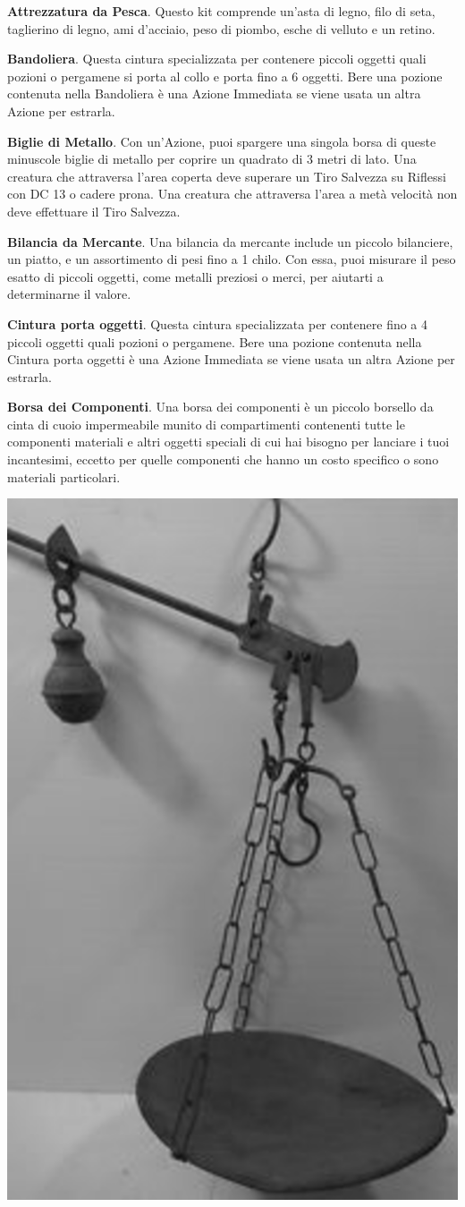 \begin{multicols}{2}
\textbf{Attrezzatura da Pesca}. Questo kit comprende un'asta di legno, filo di seta, taglierino di legno, ami d'acciaio, peso di piombo, esche di velluto e un retino.

\textbf{Bandoliera}\label{Bandoliera}\hypertarget{Bandoliera}{}. Questa cintura specializzata per contenere piccoli oggetti quali pozioni o pergamene si porta al collo e porta fino a 6 oggetti. Bere una pozione contenuta nella Bandoliera è una Azione Immediata se viene usata un altra Azione per estrarla.

\textbf{Biglie di Metallo}. Con un'Azione, puoi spargere una singola borsa di queste minuscole biglie di metallo per coprire un quadrato di 3 metri di lato. Una creatura che attraversa l'area coperta deve superare un Tiro Salvezza su Riflessi con DC 13 o cadere prona. Una creatura che attraversa l'area a metà velocità non deve effettuare il Tiro Salvezza.

\textbf{Bilancia da Mercante}. Una bilancia da mercante include un piccolo bilanciere, un piatto, e un assortimento di pesi fino a 1 chilo. Con essa, puoi misurare il peso esatto di piccoli oggetti, come metalli preziosi o merci, per aiutarti a determinarne il valore.

\textbf{Cintura porta oggetti}. Questa cintura specializzata per contenere fino a 4 piccoli oggetti quali pozioni o pergamene. Bere una pozione contenuta nella Cintura porta oggetti è una Azione Immediata se viene usata un altra Azione per estrarla.\label{Cintura porta oggetti}\hypertarget{Cintura porta oggetti}{}

\textbf{Borsa dei Componenti}\label{Borsa dei Componenti}\hypertarget{Borsa dei Componenti}{}. Una borsa dei componenti è un piccolo borsello da cinta di cuoio impermeabile munito di compartimenti contenenti tutte le componenti materiali e altri oggetti speciali di cui hai bisogno per lanciare i tuoi incantesimi, eccetto per quelle componenti che hanno un costo specifico o sono materiali particolari.

\begin{center}
	\includegraphics[height=0.8\linewidth]{immagini/stadera.png}
\end{center}


\end{multicols}
